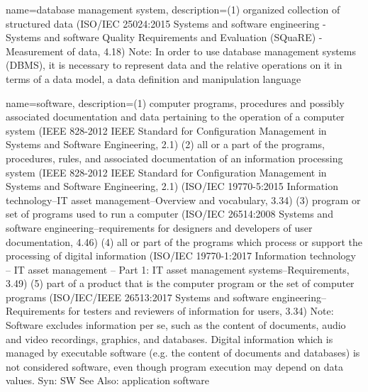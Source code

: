 {
    name={database management system},
    description={(1) organized collection of structured data (ISO/IEC 25024:2015 Systems and software engineering - Systems and software Quality Requirements and Evaluation (SQuaRE) - Measurement of data, 4.18) Note: In order to use database management systems (DBMS), it is necessary to represent data and the relative operations on it in terms of a data model, a data definition and manipulation language}
}

{
    name={software},
    description={(1) computer programs, procedures and possibly associated documentation and data pertaining to the operation of a computer system (IEEE 828-2012 IEEE Standard for Configuration Management in Systems and Software Engineering, 2.1) (2) all or a part of the programs, procedures, rules, and associated documentation of an information processing system (IEEE 828-2012 IEEE Standard for Configuration Management in Systems and Software Engineering, 2.1) (ISO/IEC 19770-5:2015 Information technology--IT asset management--Overview and vocabulary, 3.34) (3) program or set of programs used to run a computer (ISO/IEC 26514:2008 Systems and software engineering--requirements for designers and developers of user documentation, 4.46) (4) all or part of the programs which process or support the processing of digital information (ISO/IEC 19770-1:2017 Information technology -- IT asset management -- Part 1: IT asset management systems--Requirements, 3.49) (5) part of a product that is the computer program or the set of computer programs (ISO/IEC/IEEE 26513:2017 Systems and software engineering--Requirements for testers and reviewers of information for users, 3.34) Note: Software excludes information per se, such as the content of documents, audio and video recordings, graphics, and databases. Digital information which is managed by executable software (e.g. the content of documents and databases) is not considered software, even though program execution may depend on data values. Syn: SW See Also: application software}
}



